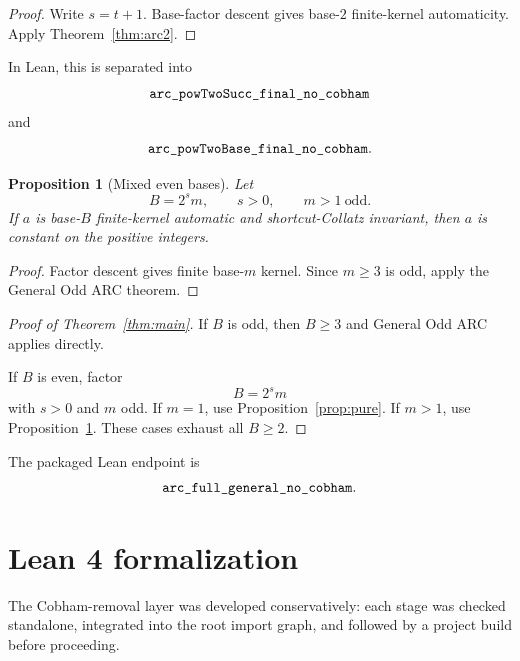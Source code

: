 \documentclass[11pt]{article}
\newtheorem{proposition}[theorem]{Proposition}
\theoremstyle{remark}
\newcommand{\code}[1]{\texttt{\detokenize{#1}}}
\begin{document}
\begin{proof}
Write $s=t+1$.  Base-factor descent gives base-$2$ finite-kernel automaticity.
Apply Theorem~\ref{thm:arc2}.
\end{proof}

In Lean, this is separated into
\[
\code{arc_powTwoSucc_final_no_cobham}
\]
and
\[
\code{arc_powTwoBase_final_no_cobham}.
\]

\begin{proposition}[Mixed even bases]\label{prop:mixed}
Let
\[
B=2^s m,
\qquad
s>0,
\qquad
m>1\ \text{odd}.
\]
If $a$ is base-$B$ finite-kernel automatic and shortcut-Collatz invariant,
then $a$ is constant on the positive integers.
\end{proposition}

\begin{proof}
Factor descent gives finite base-$m$ kernel.  Since $m\ge3$ is odd, apply the
General Odd ARC theorem.
\end{proof}

\begin{proof}[Proof of Theorem~\ref{thm:main}]
If $B$ is odd, then $B\ge3$ and General Odd ARC applies directly.

If $B$ is even, factor
\[
B=2^s m
\]
with $s>0$ and $m$ odd.  If $m=1$, use
Proposition~\ref{prop:pure}.  If $m>1$, use
Proposition~\ref{prop:mixed}.  These cases exhaust all $B\ge2$.
\end{proof}

The packaged Lean endpoint is
\[
\code{arc_full_general_no_cobham}.
\]

\section{Lean 4 formalization}

The Cobham-removal layer was developed conservatively: each stage was checked
standalone, integrated into the root import graph, and followed by a project
build before proceeding.
\end{document}
